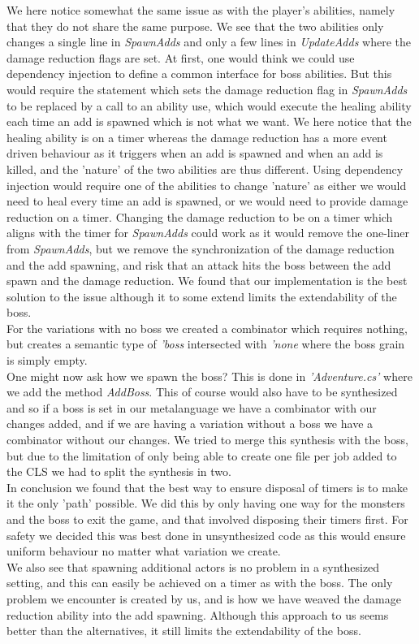 We here notice somewhat the same issue as with the player's abilities, namely that they do not share the same purpose. We see that the two abilities only changes a single line in \textit{SpawnAdds} and only a few lines in \textit{UpdateAdds} where the damage reduction flags are set. At first, one would think we could use dependency injection to define a common interface for boss abilities. But this would require the statement which sets the damage reduction flag in \textit{SpawnAdds} to be replaced by a call to an ability use, which would execute the healing ability each time an add is spawned which is not what we want. We here notice that the healing ability is on a timer whereas the damage reduction has a more event driven behaviour as it triggers when an add is spawned and when an add is killed, and the 'nature' of the two abilities are thus different. Using dependency injection would require one of the abilities to change 'nature' as either we would need to heal every time an add is spawned, or we would need to provide damage reduction on a timer. Changing the damage reduction to be on a timer which aligns with the timer for \textit{SpawnAdds} could work as it would remove the one-liner from \textit{SpawnAdds}, but we remove the synchronization of the damage reduction and the add spawning, and risk that an attack hits the boss between the add spawn and the damage reduction. We found that our implementation is the best solution to the issue although it to some extend limits the extendability of the boss.\\
For the variations with no boss we created a combinator which requires nothing, but creates a semantic type of \textit{'boss} intersected with \textit{'none} where the boss grain is simply empty.\\

One might now ask how we spawn the boss? This is done in \textit{'Adventure.cs'} where we add the method \textit{AddBoss}. This of course would also have to be synthesized and so if a boss is set in our metalanguage we have a combinator with our changes added, and if we are having a variation without a boss we have a combinator without our changes. We tried to merge this synthesis with the boss, but due to the limitation of only being able to create one file per job added to the CLS we had to split the synthesis in two.\\

In conclusion we found that the best way to ensure disposal of timers is to make it the only 'path' possible. We did this by only having one way for the monsters and the boss to exit the game, and that involved disposing their timers first. For safety we decided this was best done in unsynthesized code as this would ensure uniform behaviour no matter what variation we create.\\
We also see that spawning additional actors is no problem in a synthesized setting, and this can easily be achieved on a timer as with the boss. The only problem we encounter is created by us, and is how we have weaved the damage reduction ability into the add spawning. Although this approach to us seems better than the alternatives, it still limits the extendability of the boss.